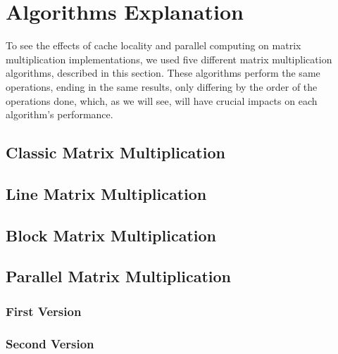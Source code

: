 \section{Algorithms Explanation} \label{section:algorithms}

To see the effects of cache locality and parallel computing on matrix multiplication implementations, we used five different matrix multiplication algorithms, described in this section. These algorithms perform the same operations, ending in the same results, only differing by the order of the operations done, which, as we will see, will have crucial impacts on each algorithm's performance.

\subsection{Classic Matrix Multiplication}



\subsection{Line Matrix Multiplication}

\subsection{Block Matrix Multiplication}

\subsection{Parallel Matrix Multiplication}

\subsubsection{First Version}

\subsubsection{Second Version}

